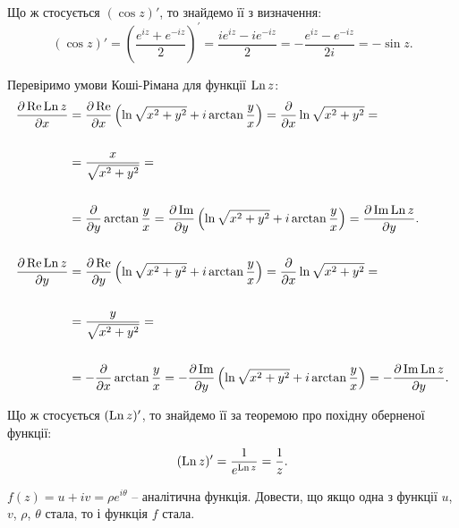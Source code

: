 \begin{solution}
    Що ж стосується $(\cos z)'$, то знайдемо її з визначення: 
    \[ (\cos z)' = \left( \dfrac{e^{iz} + e^{-iz}}{2} \right)^\prime = \dfrac{i e^{iz} - i e^{-iz}}{2} = - \dfrac{e^{iz} - e^{-iz}}{2i} = - \sin z. \]

    Перевіримо умови Коші-Рімана для функції $\operatorname{Ln} z$:
    \begin{align*}
        \dfrac{\partial \operatorname{Re} \operatorname{Ln} z}{\partial x} &= \dfrac{\partial \operatorname{Re}}{\partial x} \left(\ln \sqrt{x^2 + y^2} + i \arctan \dfrac yx\right) = \dfrac{\partial}{\partial x} \ln \sqrt{x^2 + y^2} = \\
        \\
        &= \dfrac{x}{\sqrt{x^2 + y^2}} = \\
        \\
        &= \dfrac{\partial}{\partial y} \arctan \dfrac yx = \dfrac{\partial \operatorname{Im}}{\partial y} \left(\ln \sqrt{x^2 + y^2} + i \arctan \dfrac y x\right) = \dfrac{\partial \operatorname{Im} \operatorname{Ln} z}{\partial y}. \\
        \\
        \dfrac{\partial \operatorname{Re} \operatorname{Ln} z}{\partial y} &= \dfrac{\partial \operatorname{Re}}{\partial y} \left(\ln \sqrt{x^2 + y^2} + i \arctan \dfrac yx\right) = \dfrac{\partial}{\partial x} \ln \sqrt{x^2 + y^2} = \\
        \\
        &= \dfrac{y}{\sqrt{x^2 + y^2}} = \\
        \\
        &= - \dfrac{\partial}{\partial x} \arctan \dfrac yx = - \dfrac{\partial \operatorname{Im}}{\partial y} \left(\ln \sqrt{x^2 + y^2} + i \arctan \dfrac yx\right) = - \dfrac{\partial \operatorname{Im} \operatorname{Ln} z}{\partial y}.
    \end{align*}

    Що ж стосується $(\operatorname{Ln} z)'$, то знайдемо її за теоремою про похідну оберненої функції:
    \[ (\operatorname{Ln} z)' = \dfrac{1}{e^{\operatorname{Ln} z}} = \dfrac{1}{z}. \]
\end{solution}

\begin{problem}[Волковиський, 134]
    $f(z) = u + iv = \rho e^{i\theta}$ -- аналітична функція. Довести, що якщо одна з функції $u$, $v$, $\rho$, $\theta$ стала, то і функція $f$ стала.
\end{problem}

